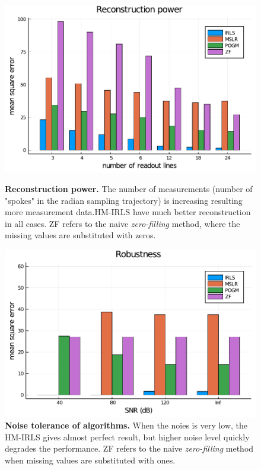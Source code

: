 \begin{figure}[p]
    \centering
    \begin{minipage}[t]{0.48\linewidth}
        \centering
        \includegraphics[width=\linewidth]{images/reconstruction_power.pdf}
        \caption{\textbf{Reconstruction power.} The number of measurements (number of "spokes" in the radian sampling trajectory) is increasing resulting more measurement data.HM-IRLS have much better reconstruction in all cases. ZF refers to the naive \textit{zero-filling} method, where the missing values are substituted with zeros.}
        \label{fig:reconstruction_power}
    \end{minipage}
    \begin{minipage}[t]{0.48\linewidth}
        \centering
        \includegraphics[width=\linewidth]{images/noise_tolerance.pdf}
        \caption{\textbf{Noise tolerance of algorithms.} When the noies is very low, the HM-IRLS gives almost perfect result, but higher noise level quickly degrades the performance. ZF refers to the naive \textit{zero-filling} method when missing values are substituted with ones.}
        \label{fig:noise_tolerance}
    \end{minipage}
\end{figure}

